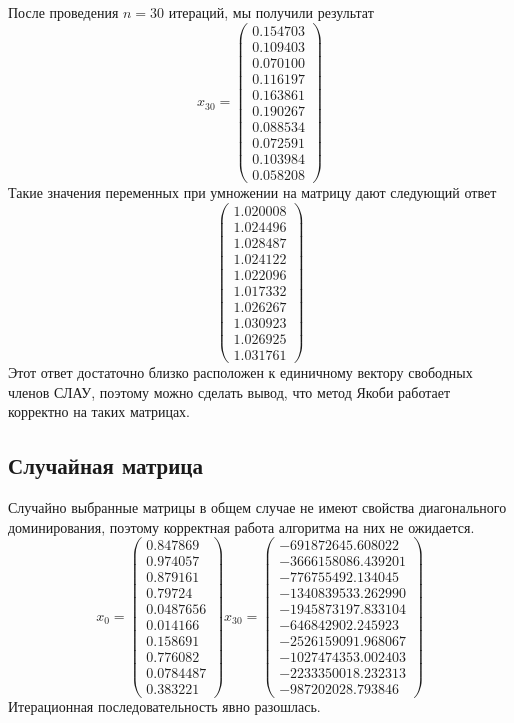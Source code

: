 \documentclass[../../report.tex]{subfiles}
\begin{document}
После проведения $n = 30$ итераций, мы получили результат 
\[
x_{30} = 
\begin{pmatrix} 
0.154703 \\ 
0.109403 \\ 
0.070100 \\ 
0.116197 \\ 
0.163861 \\ 
0.190267 \\ 
0.088534 \\ 
0.072591 \\ 
0.103984 \\ 
0.058208  
\end{pmatrix}
\]
Такие значения переменных при умножении на матрицу дают следующий ответ
\[
\begin{pmatrix}
1.020008 \\
1.024496 \\
1.028487 \\
1.024122 \\
1.022096 \\
1.017332 \\
1.026267 \\
1.030923 \\
1.026925 \\
1.031761
\end{pmatrix}
\]
Этот ответ достаточно близко расположен к единичному вектору свободных членов СЛАУ,
поэтому можно сделать вывод, что метод Якоби работает корректно на таких матрицах.

\subsection{Случайная матрица}
Случайно выбранные матрицы в общем случае не имеют свойства диагонального доминирования, 
поэтому корректная работа алгоритма на них не ожидается.
\[
x_0 = 
\begin{pmatrix} 
0.847869 \\
0.974057 \\
0.879161 \\
0.79724 \\
0.0487656 \\
0.014166 \\
0.158691 \\
0.776082 \\
0.0784487 \\
0.383221 
\end{pmatrix}
x_{30} = 
\begin{pmatrix}
-691872645.608022 \\
-3666158086.439201 \\
-776755492.134045 \\
-1340839533.262990 \\
-1945873197.833104 \\
-646842902.245923 \\
-2526159091.968067 \\
-1027474353.002403 \\
-2233350018.232313 \\
-987202028.793846
\end{pmatrix}
\]
Итерационная последовательность явно разошлась.
\end{document}

